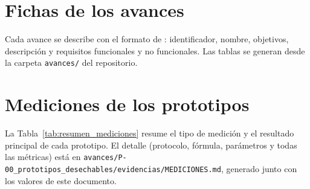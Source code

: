
\chapter{Fichas de los avances}
\label{ap:avances}

Cada avance se describe con el formato de \citet{figueroa2025arquitectura}: identificador, nombre, objetivos, descripción y requisitos funcionales y no funcionales. Las tablas se generan desde la carpeta \texttt{avances/} del repositorio.

{\small}

\chapter{Mediciones de los prototipos}
\label{ap:mediciones}

La Tabla~\ref{tab:resumen_mediciones} resume el tipo de medición y el resultado principal de cada prototipo. El detalle (protocolo, fórmula, parámetros y todas las métricas) está en \texttt{avances/P-00\_prototipos\_desechables/evidencias/MEDICIONES.md}, generado junto con los valores de este documento.

